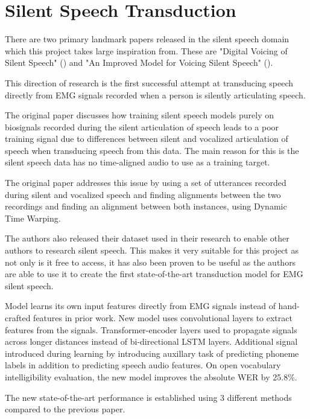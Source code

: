 \section{Silent Speech Transduction}

There are two primary landmark papers released in the silent speech domain
which this project takes large inspiration from. These are
"Digital Voicing of Silent Speech" (\cite{gaddy2020digital}) and
"An Improved Model for Voicing Silent Speech" (\cite{gaddy2021improved}).

This direction of research is the first successful attempt at transducing
speech directly from EMG signals recorded when a person is silently
articulating speech.

The original paper discusses how training silent speech models purely on biosignals
recorded during the silent articulation of speech leads to a poor training
signal due to differences between silent and vocalized articulation of
speech when transducing speech from this data. The main reason for 
this is the silent speech data has no time-aligned audio to use as a 
training target.

The original paper addresses this issue by using a set of utterances recorded during
silent and vocalized speech and finding alignments between the two recordings
and finding an alignment between both instances, using Dynamic
Time Warping.

The authors also released their dataset used in their research
to enable other authors to research silent speech. This makes
it very suitable for this project as not only is it free
to access, it has also been proven to be useful as the authors
are able to use it to create the first 
state-of-the-art transduction model for EMG silent speech.

Model learns its own input features directly from EMG signals
instead of hand-crafted features in prior work.
New model uses convolutional layers to extract features from the signals.
Transformer-encoder layers used to propagate signals across longer distances
instead of bi-directional LSTM layers.
Additional signal introduced during learning by introducing auxillary task of
predicting phoneme labels in addition to predicting speech audio features.
On open vocabulary intelligibility evaluation, the new model improves the absolute WER by 25.8\%.

The new state-of-the-art performance is established using
3 different methods compared to the previous paper.

